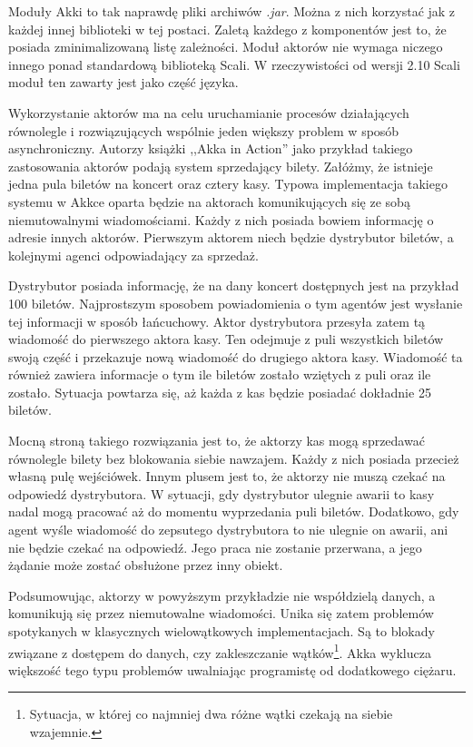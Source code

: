 \documentclass[brudnopis]{xmgr}
\begin{document}
Moduły Akki to tak naprawdę pliki archiwów \emph{.jar}. Można z nich korzystać jak z każdej innej biblioteki w tej postaci. Zaletą każdego z komponentów jest to, że posiada zminimalizowaną listę zależności. Moduł aktorów nie wymaga niczego innego ponad standardową biblioteką Scali. W rzeczywistości od wersji 2.10 Scali moduł ten zawarty jest jako część języka. 

Wykorzystanie aktorów ma na celu uruchamianie procesów działających równolegle i rozwiązujących wspólnie jeden większy problem w sposób asynchroniczny. Autorzy książki ,,Akka in Action'' \cite[s. 9]{Roestenburg:2012:AIA} jako przykład takiego zastosowania aktorów podają system sprzedający bilety. Załóżmy, że istnieje jedna pula biletów na koncert oraz cztery kasy. Typowa implementacja takiego systemu w Akkce oparta będzie na aktorach komunikujących się ze sobą niemutowalnymi wiadomościami. Każdy z nich posiada bowiem informację o adresie innych aktorów. Pierwszym aktorem niech będzie dystrybutor biletów, a kolejnymi agenci odpowiadający za sprzedaż.

Dystrybutor posiada informację, że na dany koncert dostępnych jest na przykład 100 biletów. Najprostszym sposobem powiadomienia o tym agentów jest wysłanie tej informacji w sposób łańcuchowy. Aktor dystrybutora przesyła zatem tą wiadomość do pierwszego aktora kasy. Ten odejmuje z puli wszystkich biletów swoją część i przekazuje nową wiadomość do drugiego aktora kasy. Wiadomość ta również zawiera informacje o tym ile biletów zostało wziętych z puli oraz ile zostało. Sytuacja powtarza się, aż każda z kas będzie posiadać dokładnie 25 biletów.

Mocną stroną takiego rozwiązania jest to, że aktorzy kas mogą sprzedawać równolegle bilety bez blokowania siebie nawzajem. Każdy z nich posiada przecież własną pulę wejściówek. Innym plusem jest to, że aktorzy nie muszą czekać na odpowiedź dystrybutora. W sytuacji, gdy dystrybutor ulegnie awarii to kasy nadal mogą pracować aż do momentu wyprzedania puli biletów. Dodatkowo, gdy agent wyśle wiadomość do zepsutego dystrybutora to nie ulegnie on awarii, ani nie będzie czekać na odpowiedź. Jego praca nie zostanie przerwana, a jego żądanie może zostać obsłużone przez inny obiekt.

Podsumowując, aktorzy w powyższym przykładzie nie współdzielą danych, a komunikują się przez niemutowalne wiadomości. Unika się zatem problemów spotykanych w klasycznych wielowątkowych implementacjach. Są to blokady związane z dostępem do danych, czy zakleszczanie wątków\footnote{Sytuacja, w której co najmniej dwa różne wątki czekają na siebie wzajemnie.}. Akka wyklucza większość tego typu problemów uwalniając programistę od dodatkowego ciężaru.
\end{document}
